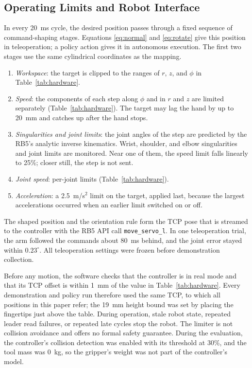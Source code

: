 \subsection{Operating Limits and Robot Interface}
\label{sec:limits}
In every 20~ms cycle, the desired position passes through a fixed sequence of
command-shaping stages. Equations \eqref{eq:normal} and \eqref{eq:rotate}
give this position in teleoperation; a policy action gives it in autonomous
execution. The first two stages use the same cylindrical coordinates as
the mapping.
\begin{enumerate}
\item \emph{Workspace}: the target is clipped to the ranges of $r$, $z$, and
$\phi$ in Table~\ref{tab:hardware}.
\item \emph{Speed}: the components of each step along $\phi$ and in $r$ and
$z$ are limited separately (Table~\ref{tab:hardware}). The target may lag the
hand by up to 20~mm and catches up after the hand stops.
\item \emph{Singularities and joint limits}: the joint angles of the step are
predicted by the RB5's analytic inverse kinematics. Wrist, shoulder, and
elbow singularities and joint limits are monitored. Near one of them, the
speed limit falls linearly to 25\%; closer still, the step is not sent.
\item \emph{Joint speed}: per-joint limits (Table~\ref{tab:hardware}).
\item \emph{Acceleration}: a 2.5~m/s$^2$ limit on the target, applied
last, because the largest accelerations occurred when an earlier limit
switched on or off.
\end{enumerate}
The shaped position and the orientation rule form the TCP pose that is
streamed to the controller with the RB5 API call \texttt{move\_servo\_l}.
In one teleoperation trial, the arm followed the commands about 80~ms
behind, and the joint error stayed within $0.23^\circ$. All teleoperation
settings were frozen before demonstration collection.

Before any motion, the software checks that the controller is in real mode
and that its TCP offset is within 1~mm of the value in Table~\ref{tab:hardware}.
Every demonstration and policy run therefore used the same TCP, to which all
positions in this paper refer; the 19~mm height bound was set by placing the
fingertips just above the table. During operation, stale robot state,
repeated leader read failures, or repeated late cycles stop the robot. The
limiter is not collision avoidance and offers no formal safety guarantee.
During the evaluation, the controller's collision detection was enabled with
its threshold at 30\%, and the tool mass was 0~kg, so the gripper's weight
was not part of the controller's model.
